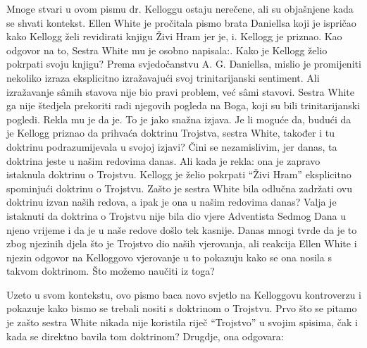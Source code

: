 Mnoge stvari u ovom pismu dr. Kelloggu ostaju nerečene, ali su objašnjene kada se shvati kontekst. Ellen White je pročitala pismo brata Daniellsa koji je ispričao kako Kellogg želi revidirati knjigu Živi Hram jer je, i. Kellogg je priznao. Kao odgovor na to, Sestra White mu je osobno napisala:. Kako je Kellogg želio pokrpati svoju knjigu? Prema svjedočanstvu A. G. Daniellsa, mislio je promijeniti nekoliko izraza eksplicitno izražavajući svoj trinitarijanski sentiment. Ali izražavanje sâmih stavova nije bio pravi problem, već sâmi stavovi. Sestra White ga nije štedjela prekoriti radi njegovih pogleda na Boga, koji su bili trinitarijanski pogledi. Rekla mu je da je. To je jako snažna izjava. Je li moguće da, budući da je Kellogg priznao da prihvaća doktrinu Trojstva, sestra White, također i tu doktrinu podrazumijevala u svojoj izjavi? Čini se nezamislivim, jer danas, ta doktrina jeste u našim redovima danas. Ali kada je rekla: ona je zapravo istaknula doktrinu o Trojstvu. Kellogg je želio pokrpati “Živi Hram” eksplicitno spominjući doktrinu o Trojstvu. Zašto je sestra White bila odlučna zadržati ovu doktrinu izvan naših redova, a ipak je ona u našim redovima danas? Valja je istaknuti da doktrina o Trojstvu nije bila dio vjere Adventista Sedmog Dana u njeno vrijeme i da je u naše redove došlo tek kasnije. Danas mnogi tvrde da je to zbog njezinih djela što je Trojstvo dio naših vjerovanja, ali reakcija Ellen White i njezin odgovor na Kelloggovo vjerovanje u to pokazuju kako se ona nosila s takvom doktrinom. Što možemo naučiti iz toga?

Uzeto u svom kontekstu, ovo pismo baca novo svjetlo na Kelloggovu kontroverzu i pokazuje kako bismo se trebali nositi s doktrinom o Trojstvu. Prvo što se pitamo je zašto sestra White nikada nije koristila riječ “Trojstvo” u svojim spisima, čak i kada se direktno bavila tom doktrinom? Drugdje, ona odgovara:

